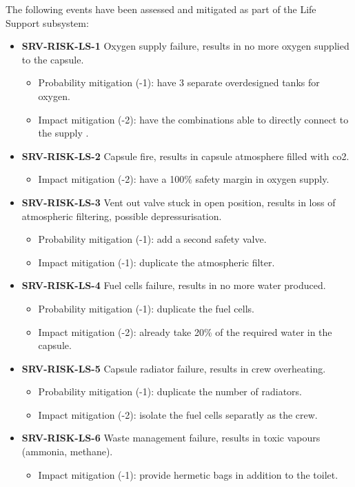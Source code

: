 \noindent The following events have been assessed and mitigated as part of the Life Support subsystem:

\begin{itemize}
	 \item \textbf{SRV-RISK-LS-1} Oxygen supply failure, results in no more oxygen supplied to the capsule.
	\begin{itemize}
		 \item Probability mitigation (-1): have 3 separate overdesigned tanks for oxygen.		 \item Impact mitigation (-2): have the combinations able to directly connect to the supply .	\end{itemize}
	 \item \textbf{SRV-RISK-LS-2} Capsule fire, results in capsule atmosphere filled with co2.
	\begin{itemize}
		 \item Impact mitigation (-2): have a 100\% safety margin in oxygen supply.	\end{itemize}
	 \item \textbf{SRV-RISK-LS-3} Vent out valve stuck in open position, results in loss of atmospheric filtering, possible depressurisation.
	\begin{itemize}
		 \item Probability mitigation (-1): add a second safety valve.		 \item Impact mitigation (-1): duplicate the atmospheric filter.	\end{itemize}
	 \item \textbf{SRV-RISK-LS-4} Fuel cells failure, results in no more water produced.
	\begin{itemize}
		 \item Probability mitigation (-1): duplicate the fuel cells.		 \item Impact mitigation (-2): already take 20\% of the required water in the capsule.	\end{itemize}
	 \item \textbf{SRV-RISK-LS-5} Capsule radiator failure, results in crew overheating.
	\begin{itemize}
		 \item Probability mitigation (-1): duplicate the number of radiators.		 \item Impact mitigation (-2): isolate the fuel cells separatly as the crew.	\end{itemize}
	 \item \textbf{SRV-RISK-LS-6} Waste management failure, results in toxic vapours (ammonia, methane).
	\begin{itemize}
		 \item Impact mitigation (-1): provide hermetic bags in addition to the toilet.	\end{itemize}
\end{itemize}

